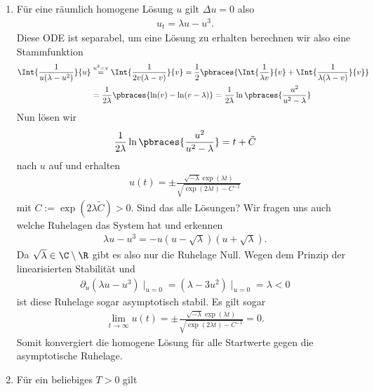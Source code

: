 \begin{solution}

\phantom{}
	\begin{enumerate}[label = (\roman*)]
		\item Für eine räumlich homogene Lösung $u$ gilt $\Delta u = 0$ also
		\begin{align*}
			u_t = \lambda u - u^3.
		\end{align*}
		Diese ODE ist separabel, um eine Lösung zu erhalten berechnen wir also eine Stammfunktion
		\begin{align*}
			\Int{\frac{1}{u(\lambda - u^2)}}{u} &\stackrel{u^2 = v}{=} \Int{\frac{1}{2 v(\lambda - v)}}{v} = \frac{1}{2} \pbraces{\Int{\frac{1}{\lambda v}}{v} + \Int{\frac{1}{\lambda (\lambda - v)}}{v}} \\
			 &= \frac{1}{2\lambda} \pbraces{\ln(v) - \ln(v - \lambda)} = \frac{1}{2 \lambda} \ln\pbraces{\frac{u^2}{u^2 - \lambda}}
		\end{align*}
		Nun lösen wir
		\begin{align*}
			\frac{1}{2 \lambda} \ln\pbraces{\frac{u^2}{u^2 - \lambda}} = t + \tilde{C}
		\end{align*}
		nach $u$ auf und erhalten
		\begin{align*}
			u(t) = \pm \frac{\sqrt{- \lambda} \exp(\lambda t)}{\sqrt{\exp(2\lambda t) - C^{-1}}}
		\end{align*}
		mit $C := \exp (2 \lambda \tilde{C}) > 0$. Sind das alle Lösungen? \newline
		Wir fragen uns auch welche Ruhelagen das System hat und erkennen
		\begin{align*}
			\lambda u - u^3 = - u (u - \sqrt{\lambda}) (u + \sqrt{\lambda}).
		\end{align*}
		Da $\sqrt{\lambda} \in \C \setminus \R$ gibt es also nur die Ruhelage Null. Wegen
    dem Prinzip der linearisierten Stabilität und
    \begin{align*}
			\partial_u (\lambda u - u^3)\mid_{u = 0} = (\lambda - 3 u^2)\mid_{u = 0} = \lambda < 0
		\end{align*}
		ist diese Ruhelage sogar asymptotisch stabil. Es gilt sogar
    \begin{align*}
      \lim_{t \to \infty} u(t) = \pm \frac{\sqrt{- \lambda} \exp(\lambda t)}{\sqrt{\exp(2\lambda t) - C^{-1}}} = 0.
    \end{align*}
    Somit konvergiert die homogene Lösung für alle Startwerte gegen die
    asymptotische Ruhelage.
		\item Für ein beliebiges $T > 0$ gilt

\end{enumerate}
\end{solution}
